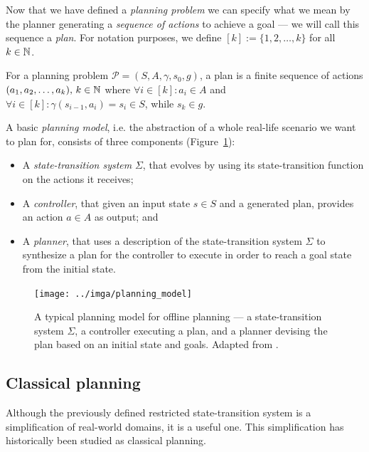 Now that we have defined a \textit{planning problem} we can specify what we mean
by the planner generating a \textit{sequence of actions} to achieve a goal --- we will
call this sequence a \textit{plan}.
For notation purposes, we define $[k] := \{1, 2, \ldots, k\}$ for all $k \in \mathbb{N}$.

\begin{defn}[Plan]\label{defn:plan}\citep[Section~1.5]{Ghallab2004}
For a planning problem $\mathcal{P} = (S, A, \gamma, s_0, g)$,
a plan is a finite sequence of actions $(a_1, a_2, \ldots, a_k),\, k \in \mathbb{N}$ where
$\forall i \in [k] : a_i \in A$ and
$\forall i \in [k] : \gamma(s_{i-1}, a_i) = s_i \in S$, while $s_k \in g$.
\end{defn}

A basic \textit{planning model}, i.e. the abstraction of a whole real-life scenario
we want to plan for, consists of three components (Figure~\ref{fig:planning-model}):
\begin{itemize}
\item A \textit{state-transition system} $\Sigma$, that evolves by using its state-transition function on the actions
it receives;
\item A \textit{controller}, that given an input state $s \in S$ and a generated plan, provides an action $a \in A$ as output; and
\item A \textit{planner}, that uses a description of the state-transition system $\Sigma$ to synthesize a plan for the controller
to execute in order to reach a goal state from the initial state.
\end{itemize}

\begin{figure}[tb]
\begin{center}
\texttt{[image: ../imga/planning\_model]}
\end{center}
\caption[A typical planning model for offline planning.]{A typical planning model for offline planning --- a state-transition system $\Sigma$, a controller executing a plan, and a planner devising the plan based on an initial state and goals. Adapted from \citep[Figure~1.3]{Ghallab2004}.}
\label{fig:planning-model}
\end{figure}

\subsection{Classical planning}\label{classical-planning}

Although the previously defined restricted state-transition system is a simplification of real-world
domains, it is a useful one. 
This simplification has historically been studied as classical planning.


